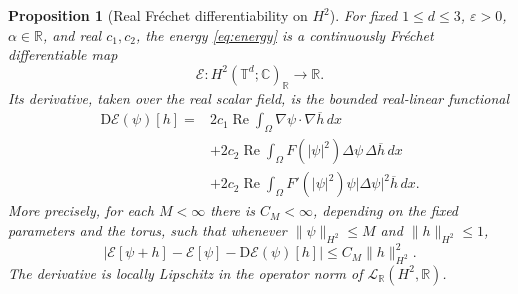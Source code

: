\documentclass[11pt]{article}
\newtheorem{proposition}{Proposition}
\newcommand{\Om}{\Omega}
\newcommand{\EE}{\mathcal E}
\newcommand{\RR}{\mathbb R}
\newcommand{\CC}{\mathbb C}
\newcommand{\DD}{\mathrm D}
\newcommand{\Rea}{\operatorname{Re}}
\begin{document}
\begin{proposition}[Real Fr\'echet differentiability on $H^2$]
\label{prop:frechet}
For fixed $1\le d\le3$, $\varepsilon>0$, $\alpha\in\RR$, and real
$c_1,c_2$, the energy \eqref{eq:energy} is a continuously Fr\'echet
differentiable map
\[
  \EE:H^2(\mathbb T^d;\CC)_{\RR}\longrightarrow\RR.
\]
Its derivative, taken over the real scalar field, is the bounded
real-linear functional
\begin{equation}\label{eq:frechet}
\begin{split}
\DD\EE(\psi)[h]
={}&2c_1\Rea\int_\Om
       \nabla\psi\cdot\nabla\overline h\,dx\\
 &+2c_2\Rea\int_\Om
       F(|\psi|^2)\Delta\psi\,\Delta\overline h\,dx\\
 &+2c_2\Rea\int_\Om
       F'(|\psi|^2)\psi|\Delta\psi|^2\overline h\,dx .
\end{split}
\end{equation}
More precisely, for each $M<\infty$ there is $C_M<\infty$, depending
on the fixed parameters and the torus, such that whenever
$\|\psi\|_{H^2}\le M$ and $\|h\|_{H^2}\le1$,
\begin{equation}\label{eq:frechet-remainder}
 \bigl|\EE[\psi+h]-\EE[\psi]-\DD\EE(\psi)[h]\bigr|
 \le C_M\|h\|_{H^2}^2.
\end{equation}
The derivative is locally Lipschitz in the operator norm of
$\mathcal L_{\RR}(H^2,\RR)$.
\end{proposition}
\end{document}

